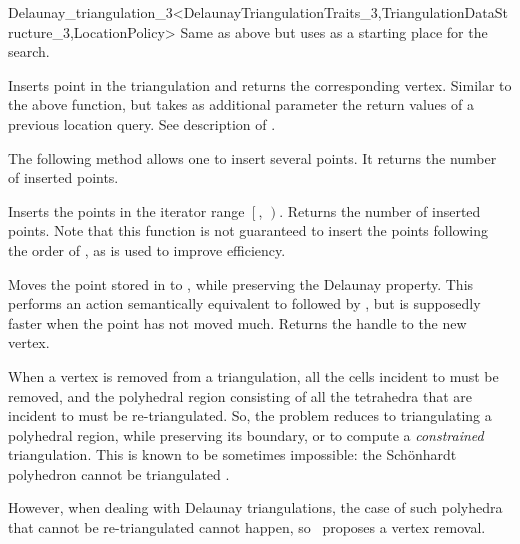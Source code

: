 \begin{ccRefClass}{Delaunay_triangulation_3<DelaunayTriangulationTraits_3,TriangulationDataStructure_3,LocationPolicy>}
{ Same as above but uses  as a starting place for the search. }

{Inserts point  in the triangulation and returns the corresponding
 vertex. Similar to the above  function, but takes as additional
 parameter the return values of a previous location query.  See description of
 .}

The following method allows one to insert several points. It returns the
number of inserted points. 

{Inserts the points in the iterator range $\left[\right.$,
$\left.\right)$.  Returns the number of inserted points.
Note that this function is not guaranteed to insert the points
following the order of , as 
is used to improve efficiency.
}


{Moves the point stored in  to , while preserving the Delaunay
property.  This performs an action semantically equivalent to 
followed by , but is supposedly faster when the point has
not moved much.  Returns the handle to the new vertex.
}


When a vertex  is removed from a triangulation, all the cells
incident to  must be removed, and the polyhedral region
consisting of all the tetrahedra that are incident to  must be
re-triangulated. 
So, the problem reduces to triangulating a polyhedral
region, while preserving its boundary, or to compute a
\textit{constrained} triangulation. This is known to be sometimes
impossible: the Sch\"onhardt polyhedron cannot be triangulated
\cite{cgal:s-cgehd-98}. 

However, when dealing with Delaunay triangulations, the case of such
polyhedra that cannot be re-triangulated cannot happen, so \cgal\
proposes a vertex removal.


\end{ccRefClass}
